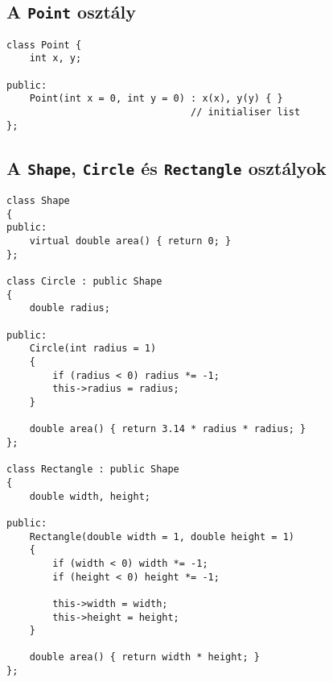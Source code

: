 \documentclass[a4paper, 11pt, oneside]{book}
\begin{document}
\subsection{A \texttt{Point} osztály}

\begin{lstlisting}[style=cppstyle, caption={A teljes \textit{Point} osztály}]
class Point {
	int x, y;
		
public:
	Point(int x = 0, int y = 0) : x(x), y(y) { } 
								// initialiser list
};
\end{lstlisting}

\subsection{A \texttt{Shape}, \texttt{Circle} és \texttt{Rectangle} osztályok}

\begin{lstlisting}[style=cppstyle, caption={A származtatást bemutató \textit{Shape} osztály}]
class Shape
{
public:
	virtual double area() { return 0; }
};

class Circle : public Shape
{
	double radius;
	
public:
	Circle(int radius = 1)
	{
		if (radius < 0) radius *= -1;
		this->radius = radius;
	}
	
	double area() { return 3.14 * radius * radius; }
};

class Rectangle : public Shape
{
	double width, height;
	
public:
	Rectangle(double width = 1, double height = 1)
	{
		if (width < 0) width *= -1;
		if (height < 0) height *= -1;
		
		this->width = width;
		this->height = height;
	}
	
	double area() { return width * height; }
};
\end{lstlisting}
\end{document}
